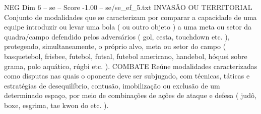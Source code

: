 \begin{textsample}{NEG Dim 6 – se – Score -1.00 – se/se\_ef\_5.txt}
INVASÃO OU TERRITORIAL Conjunto de modalidades que se caracterizam por comparar a capacidade de uma equipe introduzir ou levar uma bola ( ou outro objeto ) a uma meta ou setor da quadra/campo defendido pelos adversários ( gol, cesta, touchdown etc. ), protegendo, simultaneamente, o próprio alvo, meta ou setor do campo ( basquetebol, frisbee, futebol, futsal, futebol americano, handebol, hóquei sobre grama, polo aquático, rúgbi etc. ).
COMBATE Reúne modalidades caracterizadas como disputas nas quais o oponente deve ser subjugado, com técnicas, táticas e estratégias de desequilíbrio, contusão, imobilização ou exclusão de um determinado espaço, por meio de combinações de ações de ataque e defesa ( judô, boxe, esgrima, tae kwon do etc. ).

\end{textsample}
